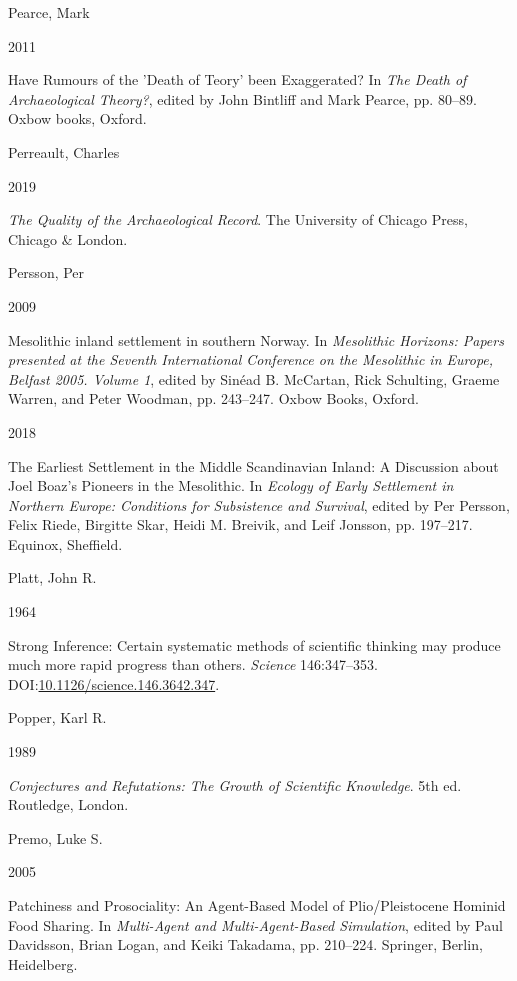 \documentclass[
  a4paper,
  oneside]{uiophdthesis}
\newlength{\cslhangindent}
\newlength{\csllabelwidth}
\newlength{\cslentryspacingunit} %
\newenvironment{CSLReferences}[2] %
 {%
  \setlength{\parindent}{0pt}
  \ifodd #1
  \let\oldpar\par
  \def\par{\hangindent=\cslhangindent\oldpar}
  \fi
  \setlength{\parskip}{#2\cslentryspacingunit}
 }%
 {}
\newcommand{\CSLBlock}[1]{#1\hfill\break}
\newcommand{\CSLLeftMargin}[1]{\parbox[t]{\csllabelwidth}{#1}}
\newcommand{\CSLRightInline}[1]{\parbox[t]{\linewidth - \csllabelwidth}{#1}\break}
\begin{document}
\begin{CSLReferences}{0}{0}
\leavevmode{}%
\CSLBlock{Pearce, Mark}
\CSLLeftMargin{ 2011}
\CSLRightInline{{Have Rumours of the 'Death of Teory' been Exaggerated?} In \emph{{The Death of Archaeological Theory?}}, edited by John Bintliff and Mark Pearce, pp. 80--89. Oxbow books, Oxford.}

\leavevmode{}%
\CSLBlock{Perreault, Charles}
\CSLLeftMargin{ 2019}
\CSLRightInline{\emph{{The Quality of the Archaeological Record}}. The University of Chicago Press, Chicago \& London.}

\leavevmode{}%
\CSLBlock{Persson, Per}
\CSLLeftMargin{ 2009}
\CSLRightInline{{Mesolithic inland settlement in southern Norway}. In \emph{{Mesolithic Horizons: Papers presented at the Seventh International Conference on the Mesolithic in Europe, Belfast 2005. Volume 1}}, edited by Sinéad B. McCartan, Rick Schulting, Graeme Warren, and Peter Woodman, pp. 243--247. Oxbow Books, Oxford.}

\leavevmode{}%
\CSLLeftMargin{ 2018 }
\CSLRightInline{{The Earliest Settlement in the Middle Scandinavian Inland: A Discussion about Joel Boaz's Pioneers in the Mesolithic}. In \emph{{Ecology of Early Settlement in Northern Europe: Conditions for Subsistence and Survival}}, edited by Per Persson, Felix Riede, Birgitte Skar, Heidi M. Breivik, and Leif Jonsson, pp. 197--217. Equinox, Sheffield.}

\leavevmode{}%
\CSLBlock{Platt, John R.}
\CSLLeftMargin{ 1964}
\CSLRightInline{{Strong Inference: Certain systematic methods of scientific thinking may produce much more rapid progress than others}. \emph{Science} 146:347--353. DOI:\href{https://doi.org/10.1126/science.146.3642.347}{10.1126/science.146.3642.347}.}

\leavevmode{}%
\CSLBlock{Popper, Karl R.}
\CSLLeftMargin{ 1989}
\CSLRightInline{\emph{{Conjectures and Refutations: The Growth of Scientific Knowledge}}. 5th ed. Routledge, London.}

\leavevmode{}%
\CSLBlock{Premo, Luke S.}
\CSLLeftMargin{ 2005}
\CSLRightInline{{Patchiness and Prosociality: An Agent-Based Model of Plio/Pleistocene Hominid Food Sharing}. In \emph{{Multi-Agent and Multi-Agent-Based Simulation}}, edited by Paul Davidsson, Brian Logan, and Keiki Takadama, pp. 210--224. Springer, Berlin, Heidelberg.}


\end{CSLReferences}
\end{document}
